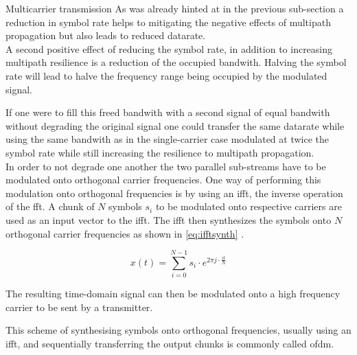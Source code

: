 \begin{subchapter}{Multicarrier transmission}
  As was already hinted at in the previous sub-section a reduction
  in symbol rate helps to mitigating the negative effects of
  multipath propagation but also leads to reduced datarate. \\

  A second positive effect of reducing the symbol rate,
  in addition to increasing multipath resilience is
  a reduction of the occupied bandwith.
  Halving the symbol rate will lead to
  halve the frequency range being occupied by the
  modulated signal.

  If one were to fill this freed bandwith with a
  second signal of equal bandwith without
  degrading the original signal one could
  transfer the same datarate while using the
  same bandwith as in the single-carrier case
  modulated at twice the symbol rate
  while still increasing the resilience to
  multipath propagation. \\

  In order to not degrade one another the two parallel
  sub-streams have to be modulated onto orthogonal
  carrier frequencies.
  One way of performing this modulation onto orthogonal
  frequencies is by using an \gls{ifft}, the inverse operation
  of the \acrlong{fft}.
  A chunk of $N$ symbols $s_{i}$ to be modulated onto respective carriers
  are used as an input vector to the \gls{ifft}.
  The \gls{ifft} then synthesizes the symbols onto $N$ orthogonal
  carrier frequencies as shown in \autoref{eq:ifftsynth} \cite{kammeyer2012}.

  \begin{equation}
    \label{eq:ifftsynth}
    x(t) = \sum_{i=0}^{N-1} s_{i} \cdot e ^ {2\pi j \cdot \frac{it}{N}}
  \end{equation}

  The resulting time-domain signal can then be modulated onto
  a high frequency carrier to be sent by a transmitter.

  This scheme of synthesising symbols onto orthogonal
  frequencies, usually using an \gls{ifft}, and sequentially
  transferring the output chunks is commonly called \gls{ofdm}.
\end{subchapter}

